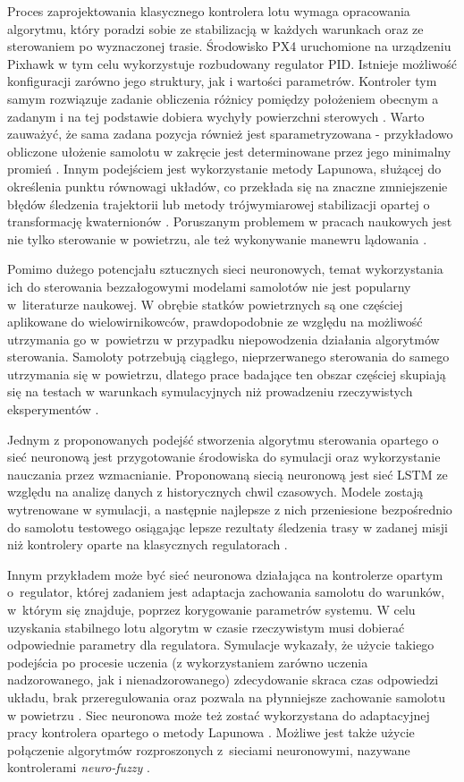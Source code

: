 \documentclass[12pt, a4paper]{article}
\begin{document}
Proces zaprojektowania klasycznego kontrolera lotu wymaga opracowania algorytmu, który poradzi sobie ze stabilizacją w każdych warunkach oraz ze sterowaniem po wyznaczonej trasie. Środowisko PX4 uruchomione na urządzeniu Pixhawk w tym celu wykorzystuje rozbudowany regulator PID. Istnieje możliwość konfiguracji zarówno jego struktury, jak i wartości parametrów. Kontroler tym samym rozwiązuje zadanie obliczenia różnicy pomiędzy położeniem obecnym a zadanym i na tej podstawie dobiera wychyły powierzchni sterowych \cite{px4pid}. Warto zauważyć, że sama zadana pozycja również jest sparametryzowana - przykładowo obliczone ułożenie samolotu w zakręcie jest determinowane przez jego minimalny promień \cite{px4diag}. Innym podejściem jest wykorzystanie metody Lapunowa, służącej do określenia punktu równowagi układów, co przekłada się na znaczne zmniejszenie błędów śledzenia trajektorii \cite{Xu2022} \cite{3dpath} lub metody trójwymiarowej stabilizacji opartej o transformację kwaternionów \cite{Chen2022}. Poruszanym problemem w pracach naukowych jest nie tylko sterowanie w powietrzu, ale też wykonywanie manewru lądowania \cite{Lungu2020}.

Pomimo dużego potencjału sztucznych sieci neuronowych, temat wykorzystania ich do sterowania bezzałogowymi modelami samolotów nie jest popularny w~literaturze naukowej. W obrębie statków powietrznych są one częściej aplikowane do wielowirnikowców, prawdopodobnie ze względu na możliwość utrzymania go w~powietrzu w przypadku niepowodzenia działania algorytmów sterowania. Samoloty potrzebują ciągłego, nieprzerwanego sterowania do samego utrzymania się w powietrzu, dlatego prace badające ten obszar częściej skupiają się na testach w warunkach symulacyjnych niż prowadzeniu rzeczywistych eksperymentów \cite{Chowdhury2022}. 

Jednym z proponowanych podejść stworzenia algorytmu sterowania opartego o sieć neuronową jest przygotowanie środowiska do symulacji oraz wykorzystanie nauczania przez wzmacnianie. Proponowaną siecią neuronową jest sieć LSTM ze względu na analizę danych z historycznych chwil czasowych. Modele zostają wytrenowane w symulacji, a następnie najlepsze z nich przeniesione bezpośrednio do samolotu testowego osiągając lepsze rezultaty śledzenia trasy w zadanej misji niż kontrolery oparte na klasycznych regulatorach \cite{Chowdhury2022}. 

Innym przykładem może być sieć neuronowa działająca na kontrolerze opartym o~regulator, której zadaniem jest adaptacja zachowania samolotu do warunków, w~którym się znajduje, poprzez korygowanie parametrów systemu. W celu uzyskania stabilnego lotu algorytm w czasie rzeczywistym musi dobierać odpowiednie parametry dla regulatora. Symulacje wykazały, że użycie takiego podejścia po procesie uczenia (z wykorzystaniem zarówno uczenia nadzorowanego, jak i nienadzorowanego) zdecydowanie skraca czas odpowiedzi układu, brak przeregulowania oraz pozwala na płynniejsze zachowanie samolotu w powietrzu \cite{Chen2021}. Siec neuronowa może też zostać wykorzystana do adaptacyjnej pracy kontrolera opartego o metody Lapunowa \cite{Sun2022}. Możliwe jest także użycie połączenie algorytmów rozproszonych z~sieciami neuronowymi, nazywane kontrolerami \textit{neuro-fuzzy} \cite{Emaletdinova2017}.
\end{document}
